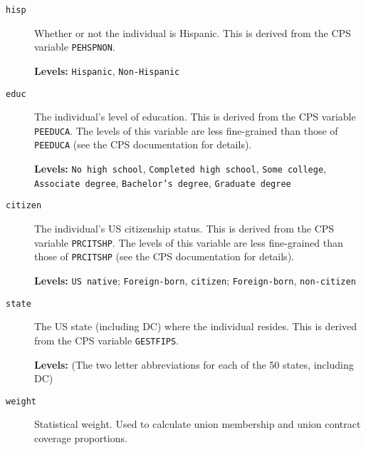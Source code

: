 \documentclass[letterpaper,12pt]{article}
\begin{document}
\begin{description}
\item[\texttt{hisp}]
Whether or not the individual is Hispanic. This is derived from the CPS variable \texttt{PEHSPNON}.

\textbf{Levels:} \texttt{Hispanic}, \texttt{Non-Hispanic}

\item[\texttt{educ}]
The individual's level of education. This is derived from the CPS variable \texttt{PEEDUCA}. The 
levels of this variable are less fine-grained than those of \texttt{PEEDUCA} (see the 
CPS documentation for details).

\textbf{Levels:} \texttt{No high school}, \texttt{Completed high school}, \texttt{Some college}, 
\texttt{Associate degree}, \texttt{Bachelor's degree}, \texttt{Graduate degree}

\item[\texttt{citizen}]
The individual's US citizenship status. This is derived from the CPS variable \texttt{PRCITSHP}. 
The levels of this variable are less fine-grained than those of \texttt{PRCITSHP} (see the CPS 
documentation for details).

\textbf{Levels:} \texttt{US native}; \texttt{Foreign-born}, \texttt{citizen}; 
\texttt{Foreign-born}, \texttt{non-citizen}

\item[\texttt{state}]
The US state (including DC) where the individual resides. This is derived from the CPS variable 
\texttt{GESTFIPS}.

\textbf{Levels:} (The two letter abbreviations for each of the 50 states, including DC)

\item[\texttt{weight}]
Statistical weight. Used to calculate union membership and union contract coverage proportions.

\end{description}
\end{document}
